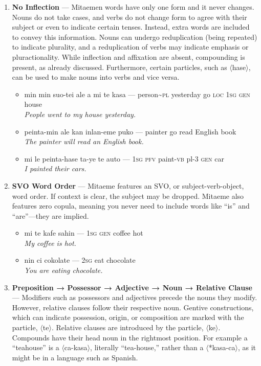 \documentclass[a4paper, titlepage]{article}
\begin{document}
\begin{enumerate}
	\item \textbf{No Inflection} — Mitaemen words have only one form and it never changes. Nouns do not take cases, and verbs do not change form to agree with their subject or even to indicate certain tenses. Instead, extra words are included to convey this information. Nouns can undergo reduplication (being repeated) to indicate plurality, and a reduplication of verbs may indicate emphasis or pluractionality. While inflection and affixation are absent, compounding is present, as already discussed.  Furthermore, certain particles, such as $\langle$hase$\rangle$, can be used to make nouns into verbs and vice versa.
	\begin{itemize}
		\item min min suo-tei ale a mi te kasa — person\textasciitilde{}\textsc{pl} yesterday go \textsc{loc 1sg gen} house\\\textit{People went to my house yesterday.}
		\item peinta-min ale kan inlan-eme puko — painter go read English book\\\textit{The painter will read an English book.}
		\item mi le peinta-hase ta-ye te auto — \textsc{1sg pfv} paint-\textsc{vb} pl-3 \textsc{gen} car \\\textit{I painted their cars.}
	\end{itemize}
	\item \textbf{SVO Word Order} — Mitaeme features an SVO, or subject-verb-object, word order. If context is clear, the subject may be dropped. Mitaeme also features zero copula, meaning you never need to include words like ``is'' and ``are''—they are implied.
	\begin{itemize}
		\item mi te kafe sahin — \textsc{1sg} \textsc{gen} coffee hot\\\textit{My coffee is hot.}
		\item nin ci cokolate — \textsc{2sg} eat chocolate\\\textit{You are eating chocolate.}
	\end{itemize}
	\item \textbf{ Preposition → Possessor → Adjective → Noun → Relative Clause  } — Modifiers such as possessors and adjectives precede the nouns they modify. However, relative clauses follow their respective noun. Gentive constructions, which can indicate possession, origin, or composition are marked with the particle, $\langle$te$\rangle$. Relative clauses are introduced by the particle, $\langle$ke$\rangle$. Compounds have their head noun in the rightmost position. For example a ``teahouse'' is a $\langle$ca-kasa$\rangle$, literally ``tea-house,'' rather than a $\langle$*kasa-ca$\rangle$, as it might be in a language such as Spanish.

\end{enumerate}
\end{document}
